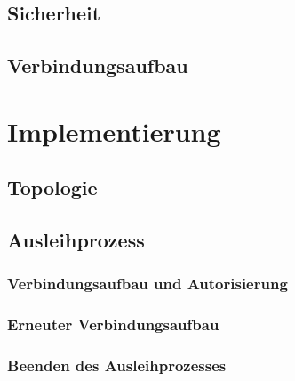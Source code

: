 \documentclass[doktyp=barbeit]{TUBAFarbeiten}
\begin{document}
	\subsection{Sicherheit}
		\label{sec: infra sicherheit}
		

	\subsection{Verbindungsaufbau}
		\label{sec: infra verbindungsaufbau}
		

\newpage
\section{Implementierung}
	\label{sec: impl allg}
	

	\subsection{Topologie}
		\label{sec: impl topologie}
		

	\subsection{Ausleihprozess}
		\label{sec: impl ausleih allg}
		

		\subsubsection{Verbindungsaufbau und Autorisierung}
			\label{sec: impl verbindungsaufbau und autorisierung}
			

		\subsubsection{Erneuter Verbindungsaufbau}
			\label{sec: impl erneuter verbindungsaufbau}
			

		\subsubsection{Beenden des Ausleihprozesses}
			\label{sec: impl beenden des ausleihprozesses}
			
\end{document}
